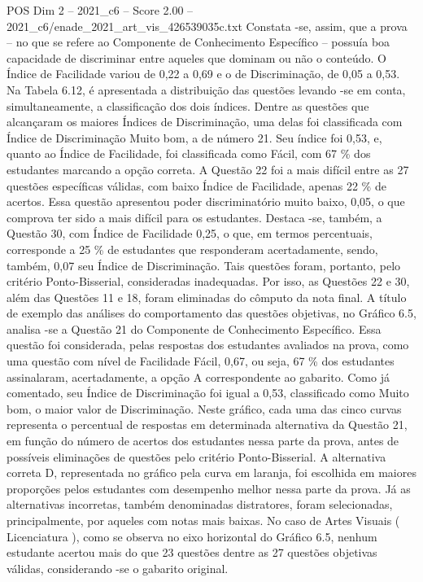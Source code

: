 \begin{textsample}{POS Dim 2 – 2021\_c6 – Score 2.00 – 2021\_c6/enade\_2021\_art\_vis\_426539035c.txt}
Constata -se, assim, que a prova – no que se refere ao Componente de Conhecimento Específico – possuía boa capacidade de discriminar entre aqueles que dominam ou não o conteúdo.
O Índice de Facilidade variou de 0,22 a 0,69 e o de Discriminação, de 0,05 a 0,53.
Na Tabela 6.12, é apresentada a distribuição das questões levando -se em conta, simultaneamente, a classificação dos dois índices.
Dentre as questões que alcançaram os maiores Índices de Discriminação, uma delas foi classificada com Índice de Discriminação Muito bom, a de número 21.
Seu índice foi 0,53, e, quanto ao Índice de Facilidade, foi classificada como Fácil, com 67 \% dos estudantes marcando a opção correta.
A Questão 22 foi a mais difícil entre as 27 questões específicas válidas, com baixo Índice de Facilidade, apenas 22 \% de acertos.
Essa questão apresentou poder discriminatório muito baixo, 0,05, o que comprova ter sido a mais difícil para os estudantes.
Destaca -se, também, a Questão 30, com Índice de Facilidade 0,25, o que, em termos percentuais, corresponde a 25 \% de estudantes que responderam acertadamente, sendo, também, 0,07 seu Índice de Discriminação.
Tais questões foram, portanto, pelo critério Ponto-Bisserial, consideradas inadequadas.
Por isso, as Questões 22 e 30, além das Questões 11 e 18, foram eliminadas do cômputo da nota final.
A título de exemplo das análises do comportamento das questões objetivas, no Gráfico 6.5, analisa -se a Questão 21 do Componente de Conhecimento Específico.
Essa questão foi considerada, pelas respostas dos estudantes avaliados na prova, como uma questão com nível de Facilidade Fácil, 0,67, ou seja, 67 \% dos estudantes assinalaram, acertadamente, a opção A correspondente ao gabarito.
Como já comentado, seu Índice de Discriminação foi igual a 0,53, classificado como Muito bom, o maior valor de Discriminação.
Neste gráfico, cada uma das cinco curvas representa o percentual de respostas em determinada alternativa da Questão 21, em função do número de acertos dos estudantes nessa parte da prova, antes de possíveis eliminações de questões pelo critério Ponto-Bisserial.
A alternativa correta D, representada no gráfico pela curva em laranja, foi escolhida em maiores proporções pelos estudantes com desempenho melhor nessa parte da prova.
Já as alternativas incorretas, também denominadas distratores, foram selecionadas, principalmente, por aqueles com notas mais baixas.
No caso de Artes Visuais ( Licenciatura ), como se observa no eixo horizontal do Gráfico 6.5, nenhum estudante acertou mais do que 23 questões dentre as 27 questões objetivas válidas, considerando -se o gabarito original.

\end{textsample}
